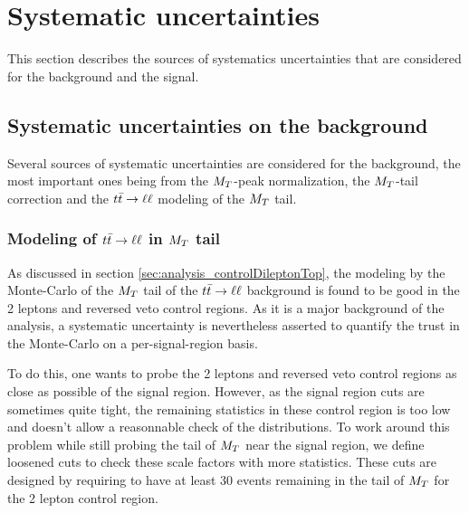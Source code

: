     \section{Systematic uncertainties \label{sec:analysis_systematics}}
        
        This section describes the sources of systematics uncertainties that are considered for the background and the signal.

        \subsection{Systematic uncertainties on the background \label{sec:background_systematics}}

            Several sources of systematic uncertainties are considered for the background,
            the most important ones being from the $M_T$-peak normalization, the $M_T$-tail
            correction and the $t\bar{t} \rightarrow \ell \ell$ modeling of the $M_T$ tail.
            
            \subsubsection{Modeling of $t\bar{t} \rightarrow \ell \ell$ in $M_T$ tail}
           
            As discussed in section \ref{sec:analysis_controlDileptonTop}, the modeling by
            the Monte-Carlo of the $M_T$ tail of the $t\bar{t} \rightarrow \ell \ell$ background is found
            to be good in the 2 leptons and reversed veto control regions. As it is a
            major background of the analysis, a systematic uncertainty is nevertheless 
            asserted to quantify the trust in the Monte-Carlo on a per-signal-region basis.

            To do this, one wants to probe the 2 leptons and reversed veto control regions
            as close as possible of the signal region. However, as the signal region cuts 
            are sometimes quite tight, the remaining statistics in these control region is
            too low and doesn't allow a reasonnable check of the distributions. To work 
            around this problem while still probing the tail of $M_T$ near the signal
            region, we define loosened cuts to check these scale factors with more 
            statistics. These cuts are designed by requiring to have at least 30 events 
            remaining in the tail of $M_T$ for the 2 lepton control region.


